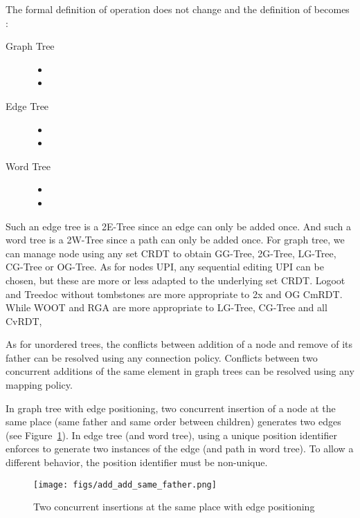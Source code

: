\documentclass[a4paper]{article}
\begin{document}
The formal definition of operation  does not change and the
definition of  becomes :
\begin{description}
  \item[Graph Tree]
\begin{itemize}
\item 
\item 
\end{itemize}
  \item[Edge Tree]
\begin{itemize}
\item 
\item 
\end{itemize}
  \item[Word Tree]
\begin{itemize}
\item 
\item 
\end{itemize}
\end{description}


Such an edge tree is a 2E-Tree since an edge can only be added
once. And such a word tree is a 2W-Tree since a path can only be added
once.  For graph tree, we can manage node using any set CRDT to obtain
GG-Tree, 2G-Tree, LG-Tree, CG-Tree or OG-Tree. As for nodes UPI, any
sequential editing UPI can be chosen, but these are more or less
adapted to the underlying set CRDT. Logoot and Treedoc without
tombstones are more appropriate to 2x and OG CmRDT. While WOOT and RGA
are more appropriate to LG-Tree, CG-Tree and all CvRDT,

As for unordered trees, the conflicts between addition of a node and
remove of its father can be resolved using any connection
policy. Conflicts between two concurrent additions of the same element
in graph trees can be resolved using any mapping policy.

In graph tree with edge positioning, two concurrent insertion of a
node at the same place (same father and same order between children)
generates two edges (see Figure~\ref{fig:add_add_pos}). In edge tree
(and word tree), using a unique position identifier enforces to
generate two instances of the edge (and path in word tree). To allow a
different behavior, the position identifier must be non-unique.
 \begin{figure}[H]
\centering
\texttt{[image: figs/add\_add\_same\_father.png]} 
\caption{Two concurrent insertions at the same place with edge
  positioning}
\label{fig:add_add_pos} 
\end{figure} 
\end{document}
